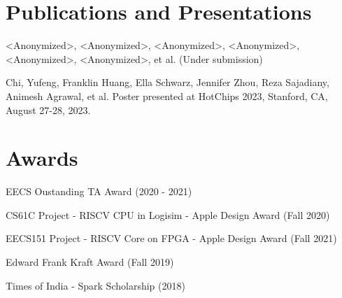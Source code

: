 \documentclass[]{deedy-resume-openfont}
\begin{document}

\section{Publications and Presentations}
\vspace{8pt}
\begin{tightemize}
\item <Anonymized>, <Anonymized>, <Anonymized>, <Anonymized>, <Anonymized>, <Anonymized>, et al.  (Under submission)
\item Chi, Yufeng, Franklin Huang, Ella Schwarz, Jennifer Zhou, Reza Sajadiany, Animesh Agrawal, et al. \href{https://hc2023.hotchips.org/assets/program/posters/HC2023.UCBerkeley.YufengChi.Poster.v06.pdf} {} Poster presented at HotChips 2023, Stanford, CA, August 27-28, 2023.
\end{tightemize}
\sectionsep

\section{Awards}
\vspace{8pt}
\begin{tightemize}
\item EECS Oustanding TA Award (2020 - 2021)
\item CS61C Project - RISCV CPU in Logisim - Apple Design Award (Fall 2020)
\item EECS151 Project - RISCV Core on FPGA - Apple Design Award (Fall 2021)
\item Edward Frank Kraft Award (Fall 2019)
\item Times of India - Spark Scholarship (2018)
\end{tightemize}
\sectionsep
\end{document}
